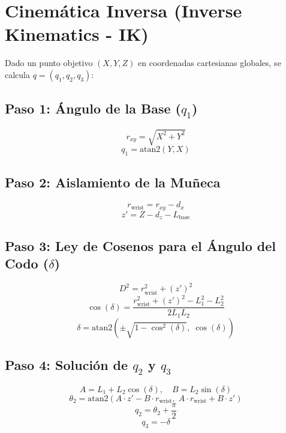 \documentclass[12pt,letterpaper]{article}
\begin{document}
\section{Cinemática Inversa (Inverse Kinematics - IK)}

Dado un punto objetivo $(X, Y, Z)$ en coordenadas cartesianas globales, se calcula $q = (q_1, q_2, q_3)$:

\subsection{\texorpdfstring{Paso 1: Ángulo de la Base ($q_1$)}{Paso 1: Angulo de la Base (q1)}}
\begin{equation}
r_{xy} = \sqrt{X^2 + Y^2}
\end{equation}
\begin{equation}
q_1 = \text{atan2}(Y, X)
\end{equation}

\subsection{Paso 2: Aislamiento de la Muñeca}
\begin{equation}
r_{\text{wrist}} = r_{xy} - d_x
\end{equation}
\begin{equation}
z' = Z - d_z - L_{\text{base}}
\end{equation}

\subsection{\texorpdfstring{Paso 3: Ley de Cosenos para el Ángulo del Codo ($\delta$)}{Paso 3: Ley de Cosenos para el Angulo del Codo (delta)}}
\begin{equation}
D^2 = r_{\text{wrist}}^2 + (z')^2
\end{equation}
\begin{equation}
\cos(\delta) = \frac{r_{\text{wrist}}^2 + (z')^2 - L_1^2 - L_2^2}{2 L_1 L_2}
\end{equation}
\begin{equation}
\delta = \text{atan2}\left(\pm \sqrt{1 - \cos^2(\delta)}, \; \cos(\delta)\right)
\end{equation}

\subsection{\texorpdfstring{Paso 4: Solución de $q_2$ y $q_3$}{Paso 4: Solucion de q2 y q3}}
\begin{equation}
A = L_1 + L_2 \cos(\delta), \quad B = L_2 \sin(\delta)
\end{equation}
\begin{equation}
\theta_2 = \text{atan2}\left( A \cdot z' - B \cdot r_{\text{wrist}}, \; A \cdot r_{\text{wrist}} + B \cdot z' \right)
\end{equation}
\begin{equation}
q_2 = \theta_2 + \frac{\pi}{2}
\end{equation}
\begin{equation}
q_3 = -\delta
\end{equation}
\end{document}
